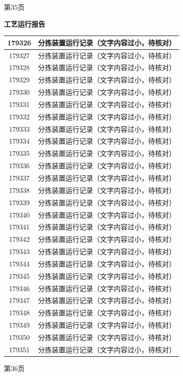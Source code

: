 \documentclass[UTF8,10pt,a4paper,fontset=fandol]{ctexart}
\begin{document}
\begin{center}
\begin{minipage}[t]{0.46\textwidth}
\vspace{2mm}
第35页
\end{minipage}
\hfill
\begin{minipage}[t]{0.46\textwidth}
\centering
\textbf{工艺运行报告}

\small
\begin{tabularx}{\linewidth}{|c|X|}
\hline
179326 & 分拣装置运行记录（文字内容过小，待核对）\\ \hline
179327 & 分拣装置运行记录（文字内容过小，待核对）\\ \hline
179328 & 分拣装置运行记录（文字内容过小，待核对）\\ \hline
179329 & 分拣装置运行记录（文字内容过小，待核对）\\ \hline
179330 & 分拣装置运行记录（文字内容过小，待核对）\\ \hline
179331 & 分拣装置运行记录（文字内容过小，待核对）\\ \hline
179332 & 分拣装置运行记录（文字内容过小，待核对）\\ \hline
179333 & 分拣装置运行记录（文字内容过小，待核对）\\ \hline
179334 & 分拣装置运行记录（文字内容过小，待核对）\\ \hline
179335 & 分拣装置运行记录（文字内容过小，待核对）\\ \hline
179336 & 分拣装置运行记录（文字内容过小，待核对）\\ \hline
179337 & 分拣装置运行记录（文字内容过小，待核对）\\ \hline
179338 & 分拣装置运行记录（文字内容过小，待核对）\\ \hline
179339 & 分拣装置运行记录（文字内容过小，待核对）\\ \hline
179340 & 分拣装置运行记录（文字内容过小，待核对）\\ \hline
179341 & 分拣装置运行记录（文字内容过小，待核对）\\ \hline
179342 & 分拣装置运行记录（文字内容过小，待核对）\\ \hline
179343 & 分拣装置运行记录（文字内容过小，待核对）\\ \hline
179344 & 分拣装置运行记录（文字内容过小，待核对）\\ \hline
179345 & 分拣装置运行记录（文字内容过小，待核对）\\ \hline
179346 & 分拣装置运行记录（文字内容过小，待核对）\\ \hline
179347 & 分拣装置运行记录（文字内容过小，待核对）\\ \hline
179348 & 分拣装置运行记录（文字内容过小，待核对）\\ \hline
179349 & 分拣装置运行记录（文字内容过小，待核对）\\ \hline
179350 & 分拣装置运行记录（文字内容过小，待核对）\\ \hline
179351 & 分拣装置运行记录（文字内容过小，待核对）\\ \hline
\end{tabularx}

\vspace{2mm}
第36页
\end{minipage}
\end{center}
\end{document}
